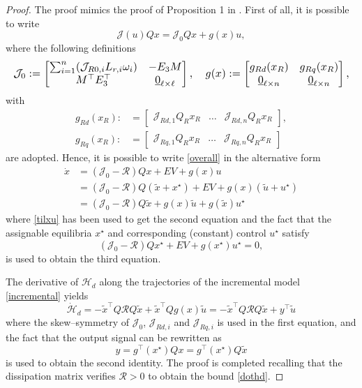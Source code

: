 \documentclass[5p,twocolumn]{elsarticle}
\numberwithin{equation}{section}
\begin{document}
\begin{proof}
The proof mimics the proof of Proposition 1 in \cite{HERetal}. First of all, it is possible to write
$$
\mathcal{J}(u)Qx=\mathcal{J}_0Qx+g(x) u,
$$
where the following definitions
$$ \resizebox{1\hsize}{!}{$
\mathcal{J}_0:=
\begin{bmatrix}\sum_{i=1}^n(\mathcal{J}_{R0,i}L_{r,i}\omega_i) & -E_3M \\ M ^\top E_3^\top&\underline{0}_{\ell\times
\ell}\end{bmatrix}, 
\quad
g(x):=\begin{bmatrix}
g_{Rd}(x_R) &g_{Rq}(x_R)\\
\underline{0}_{\ell\times n}&\underline{0}_{\ell\times n}
\end{bmatrix}, $}
$$
with \begin{align*}
g_{Rd}(x_R):&=
\begin{bmatrix}
\mathcal{J}_{Rd,1}Q_Rx_R&\dots&\mathcal{J}_{Rd,n}Q_Rx_R
\end{bmatrix},\\
g_{Rq}(x_R):&=\begin{bmatrix}
\mathcal{J}_{Rq,1}Q_Rx_R&\dots&\mathcal{J}_{Rq,n}Q_Rx_R
\end{bmatrix}
\end{align*}
are adopted. Hence, it is possible to write \eqref{overall} in the alternative form
\begin{equation}\label{incremental}
\begin{aligned}
\dot{x}&=(\mathcal{J}_{0}-\mathcal{R})Q x+EV+g(x)  u\\
&=(\mathcal{J}_{0}-\mathcal{R})Q(\tilde x+x^\star )+EV+g(x)  (\tilde u+u^\star )\\
&=(\mathcal{J}_0-\mathcal{R})Q\tilde x+g(x) \tilde u+g(\tilde x)  u^\star
\end{aligned}
\end{equation}
where \eqref{tilxu} has been used to get the second equation and the fact that the assignable equilibria $x^\star $ and corresponding (constant) control $u^\star $ satisfy
$$
(\mathcal{J}_{0}-\mathcal{R})Q x^\star +EV+g(x^\star )  u^\star =0,
$$
is used to obtain the third equation.

The derivative of $\mathcal{H}_d$ along the trajectories of the incremental model \eqref{incremental} yields
$$
\dot{\mathcal{H}}_d   =   -\tilde x^\top Q\mathcal RQ\tilde x +\tilde x^\top Qg(x)  \tilde u = -\tilde x^\top Q\mathcal RQ\tilde x + y ^\top\tilde u
$$
where the skew--symmetry of $\mathcal{J}_{0}$, $\mathcal{J}_{Rd,i}$ and $\mathcal{J}_{Rq,i}$ is used in the first equation, and the fact that the output signal   can be rewritten as
$$
y=g^\top(x^\star )Qx=g^\top(x^\star )Q \tilde x
$$
is used to obtain the second identity. The proof is completed recalling that the dissipation matrix verifies $\mathcal R > 0$  to obtain the bound  \eqref{dothd}.
\end{proof}
\end{document}
